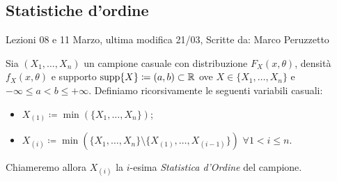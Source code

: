 \subsection{Statistiche d'ordine}
Lezioni 08 e 11 Marzo, ultima modifica 21/03, Scritte da: Marco Peruzzetto

\begin{definizione} Sia $\left(X_1,\ldots ,X_n\right)$ un campione casuale con distribuzione $F_X\left(x,\theta\right)$, densità $f_X\left(x,\theta\right)$ e supporto $\operatorname{supp}\{X\}\coloneqq (a,b)\subset\mathbb{R}$ ove $X\in \{X_1,\ldots,X_n\}$ e $-\infty\leq a<b\leq +\infty$. Definiamo ricorsivamente le seguenti variabili casuali:
\begin{itemize}
\item $X_{(1)}\coloneqq \min\left(\{X_1,\ldots,X_n\}\right)$;
\item $X_{(i)}\coloneqq \min\left(\{X_1,\ldots,X_n\}\setminus\{X_{(1)},\ldots,X_{(i-1)}\}\right)$ $\forall 1<i\leq n$. 
\end{itemize}
Chiameremo allora $X_{(i)}$ la $i$-esima \textit{Statistica d'Ordine} del campione.
\end{definizione}

